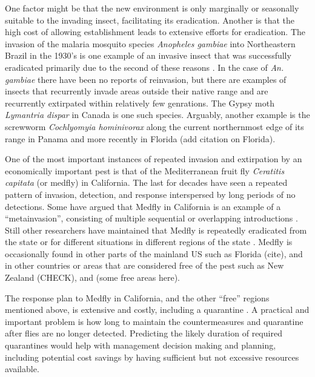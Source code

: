 \documentclass[10pt,a4paper,twocolumn]{article}
\begin{document}
One factor might be that the new environment is only marginally or 
seasonally suitable to the invading insect, facilitating its eradication.
Another is that the high cost of allowing establishment leads
to extensive efforts for eradication.
The invasion of the malaria mosquito species \textit{Anopheles gambiae}
into Northeastern Brazil in the 1930's \cite{Soper1943Anopheles}
is one example of an invasive insect that was successfully eradicated 
primarily due to the second of these
reasons \cite{Causey1943Ecology,Killeen2002Eradication}.
In the case of \textit{An. gambiae} there have been no reports of
reinvasion, but there are examples of insects that
recurrently invade areas outside their native range and are recurrently
extirpated within relatively few genrations.
The Gypsy moth \textit{Lymantria dispar} in Canada
\cite{Gray2010Hitchhikers} is one such species.
Arguably, another example is 
the screwworm \textit{Cochlyomyia hominivorax} along 
the current northernmost edge of its range in 
Panama\cite{Robinson2009Enabling}
and more recently in Florida (add citation on Florida).

One of the most important instances of repeated invasion 
and extirpation by an economically important pest is that of 
the Mediterranean fruit fly \textit{Ceratitis capitata} (or medfly) 
in California.  
The last for decades have seen a repeated pattern of
invasion, detection, and response 
interspersed by long periods of no detections.
Some have argued that Medfly in California is an example of 
a ``metainvasion'', consisting of multiple sequential or
overlapping introductions \cite{Davies1999Bioinvasions}. 
Still other researchers have maintained 
that Medfly is repeatedly eradicated
from the state \cite{Haymer1997Genetic} or for different situations
in different regions of the state
\cite{Bonizzoni2001Microsatellite,Gasperi2002Genetic}.
Medfly is occasionally found in 
other parts of the mainland US such as Florida (cite),
and in other countries or areas that are considered 
free of the pest such as New Zealand (CHECK), and (some free areas here).

The response plan to Medfly in California, and the other ``free'' 
regions mentioned above, is extensive and costly, 
including a quarantine \cite{Gilbert}.
A practical and important problem is how long to maintain 
the countermeasures and quarantine after flies are no longer detected.
Predicting the likely duration of required quarantines would help with
management decision making and planning,
including potential cost savings by having sufficient but not excessive
resources available.
\end{document}
